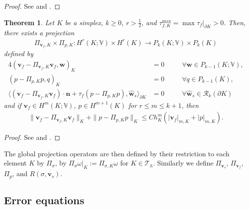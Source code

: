 \documentclass[10pt,letterpaper]{amsart}
\theoremstyle{plain} %
\newtheorem{theorem}{Theorem}[section] %
\theoremstyle{remark} %
\newcommand{\vect}[1]{\mathbf{#1}}
\begin{document}
\begin{proof}
	See \cite[Theorem~2.1]{Du-Sayas:2020a} and \cite[Theorem~3.1]{Du-Sayas:2021}. 
\end{proof}
%
%
\begin{theorem}
	Let $K$ be a simplex,  $k\geq 0$, $r > \frac 12$, and $\tau^{\max}_{f,K} = \max \tau_f|_{\partial K} > 0$. Then, there exists a projection 
	\begin{align*}
		\Pi_{\vect{v}_{f},K} \times \Pi_{p,K} : H^r(K; \mathbb{V}) \times H^r(K) \to {P}_k(K; \mathbb{V}) \times {P}_{k}(K)
	\end{align*}
	defined by 
		\begin{alignat*}{4}
			(\vect{v}_{f} - \Pi_{\vect{v}_{f},K} \vect{v}_{f} , \vect{w})_{K} &= 0 & & \quad\forall \vect{w} \in {P}_{k-1}(K; \mathbb{V}), 
			\\
			(p - \Pi_{p,K} p , q)_{K} &= 0 & & \quad \forall q \in {P}_{k-1}(K), 
			\\
			\langle (\vect{v}_{f} - \Pi_{\vect{v}_{f},K} \vect{v}_{f}) \cdot \vect{n} + \tau_{f}(p - \Pi_{p,K}p ), \widehat{\vect{w}}_{s} \rangle_{\partial K} &= 0  & &\quad  \forall \widehat{\vect{w}}_{s} \in \mathcal{R}_{k}(\partial K)
		\end{alignat*}
	and if $\vect{v}_{f} \in H^m(K; \mathbb{V})$, $p \in H^{m+1}(K)$ for $r\le m \le k+1$, then 
	\begin{align}
		\label{eq:darcy-interpolation-estimate}
		\| \vect{v}_{f} - \Pi_{\vect{v}_{f},K} \vect{v}_{f}\|_{K} + \| p - \Pi_{p,K} p \|_{K} 
		\le Ch_K^m (|\vect{v}_{f}|_{m, K} + |p|_{m, K}) .
	\end{align}
\end{theorem}
%
\begin{proof}
	See \cite{Cockburn:2010} and \cite{Du:book}. 
\end{proof}
%
The global projection operators are then defined by their restriction to each element $K$ by $\Pi_{\sigma}$, by $\Pi_{\sigma} \omega|_K := \Pi_{\sigma,K} \omega$ for $K\in \mathcal{T}_h$. Similarly we define $\Pi_{\vect{v}_s}$, $\Pi_{\vect{v}_f}$, $\Pi_{p}$, and $R(\sigma,\vect{v}_s)$. 


\subsection{Error equations}\label{subsec:error-equations}
\end{document}
